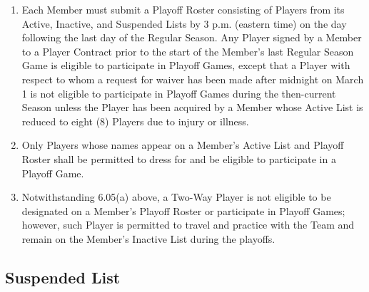 \documentclass[]{book}
\providecommand{\tightlist}{%
  \setlength{\itemsep}{0pt}\setlength{\parskip}{0pt}}
\begin{document}
\begin{enumerate}
\def\labelenumi{(\alph{enumi})}
\tightlist
\item
  Each Member must submit a Playoff Roster consisting of Players from its Active, Inactive, and Suspended Lists by 3 p.m. (eastern time) on the day following the last day of the Regular Season. Any Player signed by a Member to a Player Contract prior to the start of the Member's last Regular Season Game is eligible to participate in Playoff Games, except that a Player with respect to whom a request for waiver has been made after midnight on March 1 is not eligible to participate in Playoff Games during the then-current Season unless the Player has been acquired by a Member whose Active List is reduced to eight (8) Players due to injury or illness.
\item
  Only Players whose names appear on a Member's Active List and Playoff Roster shall be permitted to dress for and be eligible to participate in a Playoff Game.
\item
  Notwithstanding 6.05(a) above, a Two-Way Player is not eligible to be designated on a Member's Playoff Roster or participate in Playoff Games; however, such Player is permitted to travel and practice with the Team and remain on the Member's Inactive List during the playoffs.
\end{enumerate}

\hypertarget{suspended-list}{%
\subsection{Suspended List}\label{suspended-list}}
\end{document}
